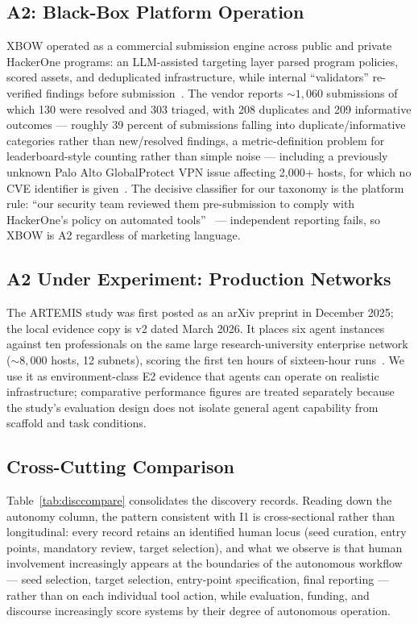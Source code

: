 \documentclass[conference,compsoc]{IEEEtran}
\begin{document}
\subsection{A2: Black-Box Platform Operation}
XBOW operated as a commercial submission engine across public and private HackerOne programs:
an LLM-assisted targeting layer parsed program policies, scored assets, and deduplicated
infrastructure, while internal ``validators'' re-verified findings before
submission~\cite{xbowtop12025}. The vendor reports ${\sim}1{,}060$ submissions of which 130
were resolved and 303 triaged, with 208 duplicates and 209 informative outcomes --- roughly 39
percent of submissions falling into duplicate/informative categories rather than new/resolved
findings, a metric-definition problem for leaderboard-style counting rather than simple noise
--- including a previously unknown Palo Alto GlobalProtect VPN issue affecting 2{,}000+ hosts,
for which no CVE identifier is given~\cite{xbowtop12025}. The decisive classifier for our
taxonomy is the platform rule: ``our security team reviewed them pre-submission to comply with
HackerOne's policy on automated tools''~\cite{xbowtop12025} --- independent reporting fails,
so XBOW is A2 regardless of marketing language.

\subsection{A2 Under Experiment: Production Networks}
The ARTEMIS study was first posted as an arXiv preprint in December 2025; the local evidence
copy is v2 dated March 2026. It places six agent instances against ten professionals on the same
large research-university enterprise network (${\sim}8{,}000$ hosts, 12 subnets), scoring the
first ten hours of sixteen-hour runs~\cite{artemis2025}. We use it as environment-class E2
evidence that agents can operate on realistic infrastructure; comparative performance figures
are treated separately because the study's evaluation design does not isolate general agent
capability from scaffold and task conditions.

\subsection{Cross-Cutting Comparison}
Table~\ref{tab:disccompare} consolidates the discovery records. Reading down the autonomy
column, the pattern consistent with I1 is cross-sectional rather than longitudinal: every record retains an
identified human locus (seed curation, entry points, mandatory review, target selection), and what
we observe is that human involvement increasingly appears at the boundaries of the autonomous
workflow --- seed selection, target selection, entry-point specification, final reporting --- rather
than on each individual tool action, while evaluation, funding, and discourse increasingly score
systems by their degree of autonomous operation.
\end{document}
